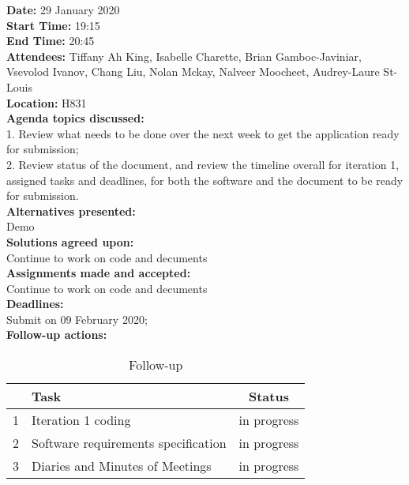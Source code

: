 \documentclass[12pt]{article}
\begin{document}
\newpage
{\bf Date:} 29 January 2020\\
{\bf Start Time:} 19:15\\
{\bf End Time:}  20:45\\
{\bf Attendees:} Tiffany Ah King,
Isabelle Charette,
Brian Gamboc-Javiniar,
Vsevolod Ivanov,
Chang Liu,
Nolan Mckay,
Nalveer Moocheet,
Audrey-Laure St-Louis\\
{\bf Location:} H831 \\
{\bf Agenda topics discussed:} \\1. Review what needs to be done over the next week to get the application ready for submission; \\2. Review status of the document, and review the timeline overall for iteration 1, assigned tasks and deadlines, for both the software and the document to be ready for submission.\\
{\bf Alternatives presented:} \\Demo \\
{\bf Solutions agreed upon:} \\ Continue to work on code and decuments\\
{\bf Assignments made and accepted:} \\  Continue to work on code and decuments\\
{\bf Deadlines:} \\Submit on 09 February 2020; \\
{\bf Follow-up actions:} \\
\begin{table}[h!]
\centering
 \begin{tabular}{||l l c ||} 
 \hline
   & Task & Status\\ [0.5ex] 
 \hline\hline
 1 & Iteration 1 coding & in progress \\ 
 2 & Software requirements specification &  in progress\\
 3 & Diaries and Minutes of Meetings &  in progress\\[1ex] 

 \hline
 \end{tabular}
\caption{Follow-up }
\label{table:1}
\end{table}
\end{document}
